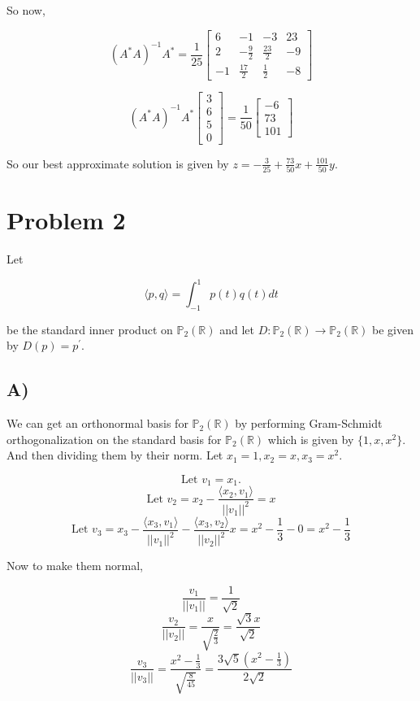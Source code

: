 \documentclass[12pt, letterpaper]{article}
\begin{document}
So now, 

\[ (A^*A)^{-1}A^* = \frac{1}{25} \begin{bmatrix} 6 & -1 & -3 & 23 \\ 2 & -\frac{9}{2} & \frac{23}{2} & -9 \\ -1 & \frac{17}{2} & \frac{1}{2} & -8 \end{bmatrix} \]

\[ (A^*A)^{-1}A^* \begin{bmatrix} 3 \\ 6 \\ 5 \\ 0 \end{bmatrix} = \frac{1}{50} \begin{bmatrix} -6 \\ 73 \\ 101 \end{bmatrix} \] 

So our best approximate solution is given by $z = -\frac{3}{25} + \frac{73}{50}x + \frac{101}{50}y$. 

\section*{Problem 2}
Let

\[ \langle p, q \rangle = \int^1_{-1} p(t)q(t)dt \]

be the standard inner product on $\mathbb{P}_2(\mathbb{R})$ and let $D: \mathbb{P}_2(\mathbb{R}) \rightarrow \mathbb{P}_2(\mathbb{R})$ be given by $D(p) = p^\prime$.

\subsection*{A)}
We can get an orthonormal basis for $\mathbb{P}_2(\mathbb{R})$ by performing Gram-Schmidt orthogonalization on the standard basis for $\mathbb{P}_2(\mathbb{R})$ which is given by $\{1, x, x^2\}$. And then dividing them by their norm. Let $x_1 = 1, x_2 = x, x_3 = x^2$.

\[ \text{Let } v_1 = x_1. \]
\[ \text{Let } v_2 = x_2 - \frac{\langle x_2, v_1 \rangle}{||v_1||^2} = x \]
\[ \text{Let } v_3 = x_3 - \frac{\langle x_3, v_1 \rangle}{||v_1||^2} - \frac{ \langle x_3, v_2 \rangle }{||v_2||^2} x =  x^2 - \frac{1}{3} - 0 = x^2 - \frac{1}{3} \]

Now to make them normal,

\[ \frac{v_1}{||v_1||} = \frac{1}{\sqrt{2}} \]
\[ \frac{v_2}{||v_2||} = \frac{x}{\sqrt{\frac{2}{3}}} = \frac{\sqrt{3}x}{\sqrt{2}} \]
\[ \frac{v_3}{||v_3||} = \frac{x^2 - \frac{1}{3}}{\sqrt{\frac{8}{45}}} = \frac{3\sqrt{5}(x^2 - \frac{1}{3})}{2\sqrt{2}} \]
\end{document}
